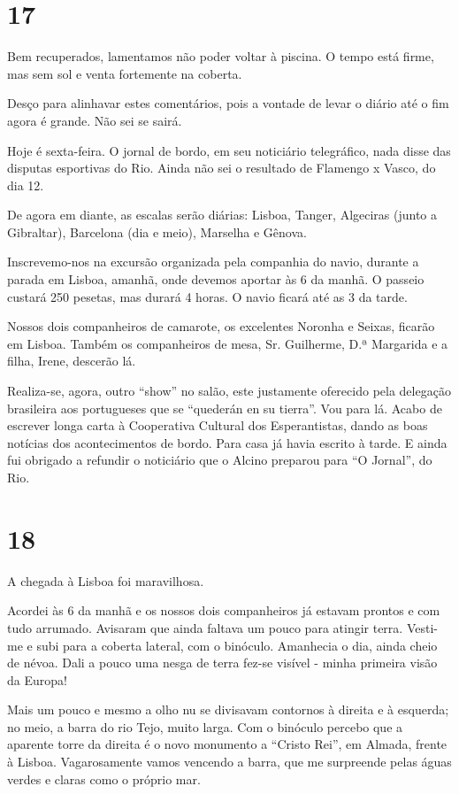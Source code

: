 \section*{17 \adfflatleafright {}}

Bem recuperados, lamentamos não poder voltar à piscina. O tempo está firme, mas sem sol e venta fortemente na coberta.

Desço para alinhavar estes comentários, pois a vontade de levar o diário até o fim agora é grande. Não sei se sairá.

Hoje é sexta-feira. O jornal de bordo, em seu noticiário telegráfico, nada disse das disputas esportivas do Rio. Ainda não sei o resultado de Flamengo x Vasco, do dia 12.

De agora em diante, as escalas serão diárias: Lisboa, Tanger, Algeciras (junto a Gibraltar), Barcelona (dia e meio), Marselha e Gênova.

Inscrevemo-nos na excursão organizada pela companhia do navio, durante a parada em Lisboa, amanhã, onde devemos aportar às 6 da manhã. O passeio custará 250 pesetas, mas durará 4 horas. O navio ficará até as 3 da tarde.

Nossos dois companheiros de camarote, os excelentes Noronha e Seixas, ficarão em Lisboa. Também os companheiros de mesa, Sr. Guilherme, D.ª Margarida e a filha, Irene, descerão lá.

Realiza-se, agora, outro “show” no salão, este justamente oferecido pela delegação brasileira aos portugueses que se “quederán en su tierra”. Vou para lá. Acabo de escrever longa carta à Cooperativa Cultural dos Esperantistas, dando as boas notícias dos acontecimentos de bordo. Para casa já havia escrito à tarde. E ainda fui obrigado a refundir o noticiário que o Alcino preparou para “O Jornal”, do Rio.

\section*{18 \adfflatleafright {}}

A chegada à Lisboa foi maravilhosa.

Acordei às 6 da manhã e os nossos dois companheiros já estavam prontos e com tudo arrumado. Avisaram que ainda faltava um pouco para atingir terra. Vesti-me e subi para a coberta lateral, com o binóculo. Amanhecia o dia, ainda cheio de névoa. Dali a pouco uma nesga de terra fez-se visível - minha primeira visão da Europa!

Mais um pouco e mesmo a olho nu se divisavam contornos à direita e à esquerda; no meio, a barra do rio Tejo, muito larga. Com o binóculo percebo que a aparente torre da direita é o novo monumento a “Cristo Rei”, em Almada, frente à Lisboa. Vagarosamente vamos vencendo a barra, que me surpreende pelas águas verdes e claras como o próprio mar.

